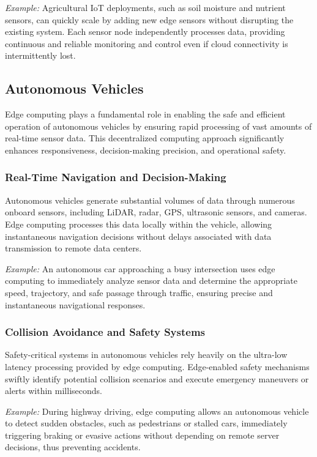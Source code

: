 \documentclass[runningheads]{llncs}
\begin{document}
\textit{Example:} Agricultural IoT deployments, such as soil moisture and nutrient sensors, can quickly scale by adding new edge sensors without disrupting the existing system. Each sensor node independently processes data, providing continuous and reliable monitoring and control even if cloud connectivity is intermittently lost.
\subsection{Autonomous Vehicles}

Edge computing plays a fundamental role in enabling the safe and efficient operation of autonomous vehicles by ensuring rapid processing of vast amounts of real-time sensor data. This decentralized computing approach significantly enhances responsiveness, decision-making precision, and operational safety.

\subsubsection{Real-Time Navigation and Decision-Making}
Autonomous vehicles generate substantial volumes of data through numerous onboard sensors, including LiDAR, radar, GPS, ultrasonic sensors, and cameras. Edge computing processes this data locally within the vehicle, allowing instantaneous navigation decisions without delays associated with data transmission to remote data centers.

\textit{Example:} An autonomous car approaching a busy intersection uses edge computing to immediately analyze sensor data and determine the appropriate speed, trajectory, and safe passage through traffic, ensuring precise and instantaneous navigational responses.

\subsubsection{Collision Avoidance and Safety Systems}
Safety-critical systems in autonomous vehicles rely heavily on the ultra-low latency processing provided by edge computing. Edge-enabled safety mechanisms swiftly identify potential collision scenarios and execute emergency maneuvers or alerts within milliseconds.

\textit{Example:} During highway driving, edge computing allows an autonomous vehicle to detect sudden obstacles, such as pedestrians or stalled cars, immediately triggering braking or evasive actions without depending on remote server decisions, thus preventing accidents.
\end{document}
